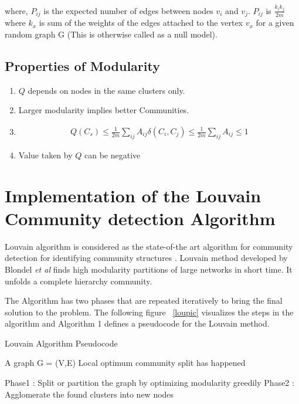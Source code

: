 where, $P_{ij}$ is the expected number of edges between nodes $v_i$ and $v_j$. $P_{ij}$ is $\frac{k_ik_j}{2m}$ where $k_x$ is sum of the weights of the edges attached to the vertex $v_x$ for a given random graph G (This is otherwise called as a null model).
    
\subsection{Properties of Modularity}
\begin{enumerate}
 \item $Q$ depends on nodes in the same clusters only. 
  \item Larger modularity implies better Communities.
    \item 
    \begin{equation}
    \begin{split}
Q(C_s) \leq \frac{1}{2m} \sum_{ij} A_{ij} \delta(C_i,C_j) \leq \frac{1}{2m} \sum_{ij} A_{ij} \leq 1
\end{split}
    \end{equation}
 \item Value taken by $Q$ can be negative
 \end{enumerate}
 
\section{Implementation of the Louvain Community detection Algorithm}
 Louvain algorithm is considered as the state-of-the art algorithm for community detection for identifying community structures \cite{Louvain}. Louvain method developed by Blondel \textit{et al} \cite{Louvain} finds high modularity partitions of large networks in short time. It unfolds a complete hierarchy community. 
 

\par  
 The Algorithm has two phases that are repeated iteratively to bring the final solution to the problem. The following figure ~\ref{loupic} visualizes the steps in the algorithm and 
 Algorithm 1 defines a pseudocode for the Louvain method. 
\begin{algorithm}[H]
\caption{Louvain Algorithm Pseudocode}
\begin{algorithmic} 
\REQUIRE A graph G = (V,E)
\ENSURE Local optimum community split has happened

\STATE Phase1 : Split or partition the graph by optimizing modularity greedily
\STATE Phase2 : Agglomerate the found clusters into new nodes
\ENDWHILE
\end{algorithmic}
\end{algorithm}


